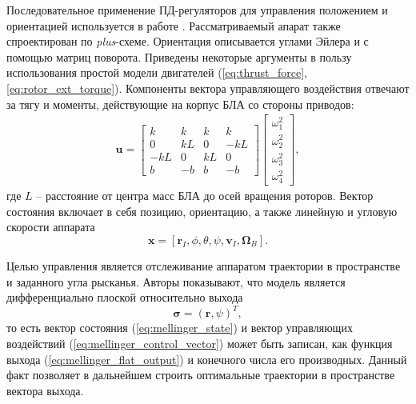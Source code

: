Последовательное применение ПД-регуляторов для управления положением и ориентацией используется в работе \cite{Mellinger01}. Рассматриваемый апарат также спроектирован по \textit{plus}-схеме.
Ориентация описывается углами Эйлера и с помощью матриц поворота.
Приведены некоторые аргументы в пользу использования простой модели двигателей
(\ref{eq:thrust_force}, \ref{eq:rotor_ext_torque}).
Компоненты вектора управляющего воздействия отвечают за тягу и моменты, действующие на корпус БЛА со стороны приводов:
\begin{equation} \label{eq:mellinger_control_vector}
	\begin{aligned}
	\bm{u} =
	\begin{bmatrix}
	k & k & k & k\\
	0 & kL & 0 & -kL\\
	-kL & 0 & k	L & 0\\
	b & -b & b & -b
	\end{bmatrix}
	\begin{bmatrix}
	\omega^{2}_{1}\\
	\omega^{2}_{2}\\
	\omega^{2}_{3}\\
	\omega^{2}_{4}
	\end{bmatrix},
	\end{aligned}
\end{equation}
где $L$ -- расстояние от центра масс БЛА до осей вращения роторов.
Вектор состояния включает в себя позицию, ориентацию, а также линейную и угловую скорости аппарата
\begin{equation} \label{eq:mellinger_state}
\bm{x} = [\bm{r}_I, \phi, \theta, \psi, \bm{v}_I, \bm{\Omega}_B].
\end{equation}

Целью управления является отслеживание аппаратом траектории в пространстве и заданного угла рысканья. Авторы показывают, что модель является дифференциально плоской \cite{Belinskaya01, Nieuwstadt01} относительно выхода
\begin{equation} \label{eq:mellinger_flat_output}
\bm{\sigma} = (\bm{r},\psi)^T,
\end{equation}
то есть вектор состояния (\ref{eq:mellinger_state}) и вектор управляющих воздействий (\ref{eq:mellinger_control_vector}) может быть записан, как функция выхода  (\ref{eq:mellinger_flat_output}) и конечного числа его производных. Данный факт позволяет в дальнейшем строить оптимальные траектории в пространстве вектора выхода.

